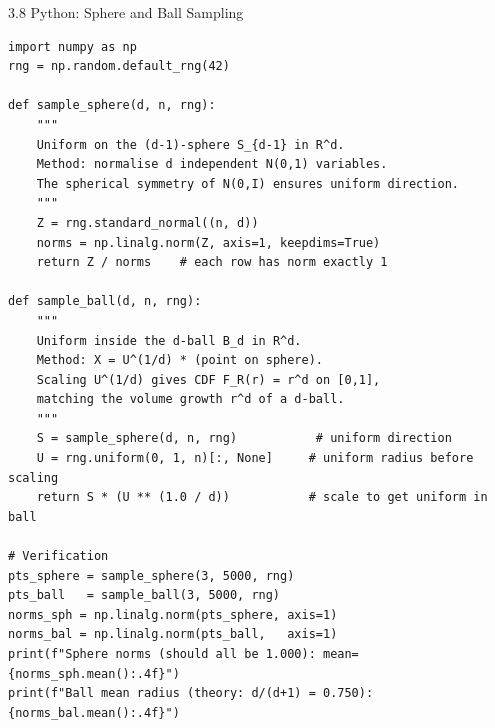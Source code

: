 \documentclass[aspectratio=169,10pt]{beamer}
\begin{document}
\begin{frame}[fragile]{3.8 Python: Sphere and Ball Sampling}
\begin{lstlisting}[style=python, caption={Uniform sampling on the (d-1)-sphere and d-ball via the Normal trick}]
import numpy as np
rng = np.random.default_rng(42)

def sample_sphere(d, n, rng):
    """
    Uniform on the (d-1)-sphere S_{d-1} in R^d.
    Method: normalise d independent N(0,1) variables.
    The spherical symmetry of N(0,I) ensures uniform direction.
    """
    Z = rng.standard_normal((n, d))
    norms = np.linalg.norm(Z, axis=1, keepdims=True)
    return Z / norms    # each row has norm exactly 1

def sample_ball(d, n, rng):
    """
    Uniform inside the d-ball B_d in R^d.
    Method: X = U^(1/d) * (point on sphere).
    Scaling U^(1/d) gives CDF F_R(r) = r^d on [0,1],
    matching the volume growth r^d of a d-ball.
    """
    S = sample_sphere(d, n, rng)           # uniform direction
    U = rng.uniform(0, 1, n)[:, None]     # uniform radius before scaling
    return S * (U ** (1.0 / d))           # scale to get uniform in ball

# Verification
pts_sphere = sample_sphere(3, 5000, rng)
pts_ball   = sample_ball(3, 5000, rng)
norms_sph = np.linalg.norm(pts_sphere, axis=1)
norms_bal = np.linalg.norm(pts_ball,   axis=1)
print(f"Sphere norms (should all be 1.000): mean={norms_sph.mean():.4f}")
print(f"Ball mean radius (theory: d/(d+1) = 0.750): {norms_bal.mean():.4f}")
\end{lstlisting}
\end{frame}
\end{document}
